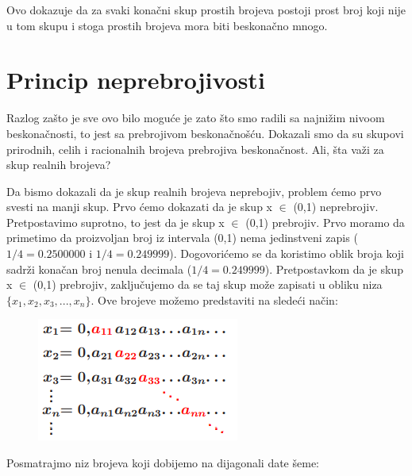 \documentclass[a4paper]{article}
\begin{document}
Ovo dokazuje da za svaki konačni skup prostih brojeva postoji prost broj koji nije u tom skupu i stoga prostih brojeva mora biti beskonačno mnogo.

\section{Princip neprebrojivosti}
\label{poglavlje:Princip neprebrojivosti}
Razlog zašto je sve ovo bilo moguće je zato što smo radili sa najnižim nivoom beskonačnosti, to jest sa prebrojivom beskonačnošću. Dokazali smo da su skupovi prirodnih, celih i racionalnih brojeva prebrojiva beskonačnost. Ali, šta važi za skup realnih brojeva?

\vspace{0,8cm}

\vspace{0,4cm}

Da bismo dokazali da je skup realnih brojeva neprebojiv, problem ćemo prvo svesti na manji skup. 
Prvo ćemo dokazati da je skup x $\in$ (0,1) neprebrojiv.
\newline
Pretpostavimo suprotno, to jest da je skup x $\in$ (0,1) prebrojiv\cite{matematicka_logika}.
Prvo moramo da primetimo da proizvoljan broj iz intervala (0,1) nema jedinstveni zapis ($1/4=0.2500000$ i $1/4=0.249999$).
Dogovorićemo se da koristimo oblik broja koji sadrži konačan broj nenula decimala ($1/4=0.249999$).
Pretpostavkom da je skup x $\in$ (0,1) prebrojiv, zaključujemo da se taj skup može zapisati u obliku niza $\{x_{1},x_{2},x_{3},...,x_{n}\}$.
\newline
Ove brojeve možemo predstaviti na sledeći način:
 \begin{figure}[ht!]
    \begin{center}
    \includegraphics[scale=1.00]{tnp.png}
    \end{center}
    \end{figure}
\newpage
Posmatrajmo niz brojeva koji dobijemo na dijagonali date šeme:\\
\end{document}
